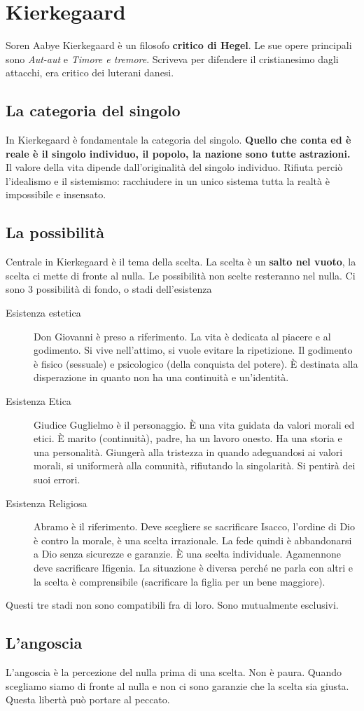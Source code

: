 
\section{Kierkegaard}
Soren Aabye Kierkegaard è un filosofo \textbf{critico di Hegel}. Le sue opere principali sono
\textit{Aut-aut} e \textit{Timore e tremore}. Scriveva per difendere il cristianesimo dagli attacchi,
era critico dei luterani danesi.

\subsection{La categoria del singolo}
In Kierkegaard è fondamentale la categoria del singolo. \textbf{Quello che conta ed è reale è il 
singolo individuo, il popolo, la nazione sono tutte astrazioni.} Il valore della vita dipende 
dall'originalità del singolo individuo. Rifiuta perciò l'idealismo e il sistemismo: racchiudere in un
unico sistema tutta la realtà è impossibile e insensato.

\subsection{La possibilità}
Centrale in Kierkegaard è il tema della scelta. La scelta è un \textbf{salto nel vuoto}, la scelta
ci mette di fronte al nulla. Le possibilità non scelte resteranno nel nulla. Ci sono 3 possibilità
di fondo, o stadi dell'esistenza
\begin{description}
  \item[Esistenza estetica] Don Giovanni è preso a riferimento. La vita è dedicata al piacere e al
    godimento. Si vive nell'attimo, si vuole evitare la ripetizione. Il godimento è fisico (sessuale)
    e psicologico (della conquista del potere). È destinata alla disperazione in quanto non ha una
    continuità e un'identità.
  \item[Esistenza Etica] Giudice Guglielmo è il personaggio. È una vita guidata da valori morali ed
    etici. È marito (continuità), padre, ha un lavoro onesto. Ha una storia e una personalità. 
    Giungerà alla tristezza in quando adeguandosi ai valori morali, si uniformerà alla comunità,
    rifiutando la singolarità. Si pentirà dei suoi errori.
  \item[Esistenza Religiosa] Abramo è il riferimento. Deve scegliere se sacrificare Isacco, l'ordine
    di Dio è contro la morale, è una scelta irrazionale. La fede quindi è abbandonarsi a Dio senza
    sicurezze e garanzie. È una scelta individuale. Agamennone deve sacrificare Ifigenia. La 
    situazione è diversa perché ne parla con altri e la scelta è comprensibile (sacrificare la figlia
    per un bene maggiore).
\end{description}
Questi tre stadi non sono compatibili fra di loro. Sono mutualmente esclusivi.

\subsection{L'angoscia}
L'angoscia è la percezione del nulla prima di una scelta. Non è paura. Quando scegliamo siamo di 
fronte al nulla e non ci sono garanzie che la scelta sia giusta. Questa libertà può portare al 
peccato.
